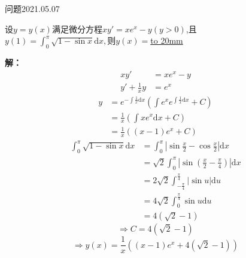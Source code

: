 \begin{mybox}{问题2021.05.07}
	
	\qquad 设$y=y(x)$满足微分方程$xy'=xe^x-y(y>0)$,且\\$y(1)=\int_{0}^{\pi}\sqrt{1-\sin x}\mathrm{d}x,$则$y(x)=$\underline{\hbox to 20mm{}}
\end{mybox}
\noindent
\textbf{解：}
\begin{align*}
	xy'&=xe^x-y\\
	y'+\frac{1}{x}y&=e^x
\end{align*}
\begin{align*}
	y&=e^{-\int \frac{1}{x}\mathrm{d}x}(\int e^x e^{\int \frac{1}{x}\mathrm{d}x}+C)\\
	&=\frac{1}{x}(\int xe^x \mathrm{d}x+C)\\
	&=\frac{1}{x}((x-1)e^x+C)
\end{align*}
\begin{align*}
	\int_{0}^{\pi}\sqrt{1-\sin x}\mathrm{d}x&=\int_{0}^{\pi}\left|\sin\frac{x}{2}-\cos\frac{x}{2}\right|\mathrm{d}x\\
	&=\sqrt{2}\int_{0}^{\pi}\left|\sin(\frac{x}{2}-\frac{\pi}{4})\right|\mathrm{d}x\\
	&=2\sqrt{2}\int_{-\frac{\pi}{4}}^{\frac{\pi}{4}}\left|\sin u\right| \mathrm{d}u\\
	&=4\sqrt{2}\int_{0}^{\frac{\pi}{4}}\sin u \mathrm{d}u\\
	&=4(\sqrt{2}-1)
\end{align*}
$$\Rightarrow C=4(\sqrt{2}-1) $$
$$\Rightarrow y(x)=\frac{1}{x}((x-1)e^x+4(\sqrt{2}-1))$$